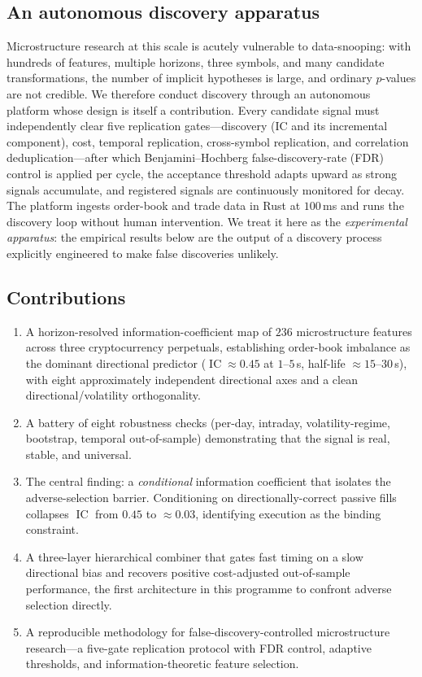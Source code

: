 \documentclass[11pt,a4paper]{article}
\theoremstyle{definition}
\theoremstyle{plain}
\DeclareMathOperator{\IC}{IC}
\begin{document}
\subsection{An autonomous discovery apparatus}

Microstructure research at this scale is acutely vulnerable to data-snooping: with hundreds of
features, multiple horizons, three symbols, and many candidate transformations, the number of
implicit hypotheses is large, and ordinary $p$-values are not credible. We therefore conduct
discovery through an autonomous platform whose design is itself a contribution. Every candidate
signal must independently clear five replication gates---discovery (IC and its incremental
component), cost, temporal replication, cross-symbol replication, and correlation
deduplication---after which Benjamini--Hochberg false-discovery-rate (FDR) control is applied per
cycle, the acceptance threshold adapts upward as strong signals accumulate, and registered
signals are continuously monitored for decay. The platform ingests order-book and trade data in
Rust at $100$\,ms and runs the discovery loop without human intervention. We treat it here as the
\emph{experimental apparatus}: the empirical results below are the output of a discovery process
explicitly engineered to make false discoveries unlikely.

\subsection{Contributions}

\begin{enumerate}
  \item A horizon-resolved information-coefficient map of $236$ microstructure features across
        three cryptocurrency perpetuals, establishing order-book imbalance as the dominant
        directional predictor ($\IC\approx 0.45$ at $1$--$5$\,s, half-life $\approx 15$--$30$\,s),
        with eight approximately independent directional axes and a clean
        directional/volatility orthogonality.
  \item A battery of eight robustness checks (per-day, intraday, volatility-regime, bootstrap,
        temporal out-of-sample) demonstrating that the signal is real, stable, and universal.
  \item The central finding: a \emph{conditional} information coefficient that isolates the
        adverse-selection barrier. Conditioning on directionally-correct passive fills collapses
        $\IC$ from $0.45$ to $\approx 0.03$, identifying execution as the binding constraint.
  \item A three-layer hierarchical combiner that gates fast timing on a slow directional bias and
        recovers positive cost-adjusted out-of-sample performance, the first architecture in this
        programme to confront adverse selection directly.
  \item A reproducible methodology for false-discovery-controlled microstructure research---a
        five-gate replication protocol with FDR control, adaptive thresholds, and
        information-theoretic feature selection.
\end{enumerate}
\end{document}
